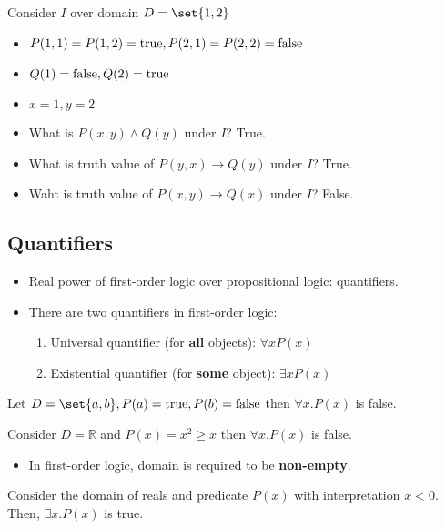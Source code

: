 \begin{example}
	Consider $I$ over domain $D=\set{1,2}$

	\begin{itemize}
		\item $P(1, 1)=P(1,2)=\text{true}, P(2,1)=P(2,2)=\text{false}$
		\item $Q(1)=\text{false}, Q(2)=\text{true}$
		\item $x=1, y=2$
		\item What is $P(x, y)\land Q(y)$ under $I$? True.
		\item What is truth value of $P(y, x)\rightarrow Q(y)$ under $I$? True.
		\item Waht is truth value of $P(x, y)\rightarrow Q(x)$ under $I$? False.
	\end{itemize}
\end{example}

\subsection{Quantifiers}
\begin{itemize}
	\item Real power of first-order logic over propositional logic: quantifiers.
	\item There are two quantifiers in first-order logic:
	      \begin{enumerate}
		      \item Universal quantifier (for \textbf{all} objects): $\forall x P(x)$
		      \item Existential quantifier (for \textbf{some} object): $\exists x P(x)$
	      \end{enumerate}
\end{itemize}

\begin{example}
	Let $D=\set{a,b}, P(a)=\true,P(b)=\false$ then $\forall x.P(x)$ is false.
\end{example}

\begin{example}
	Consider $D=\mathbb{R}$ and $P(x)=x^2\geq x$ then $\forall x.P(x)$ is false.
\end{example}

\begin{itemize}
	\item In first-order logic, domain is required to be \textbf{non-empty}.
\end{itemize}

\begin{example}
	Consider the domain of reals and predicate $P(x)$ with interpretation $x<0$.
	Then, $\exists x.P(x)$ is true.

\end{example}

